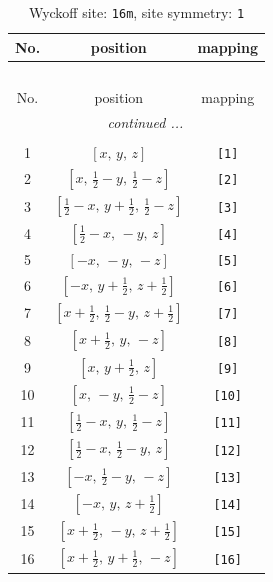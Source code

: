 \documentclass[fleqn,8pt]{jsarticle}
\begin{document}
\begin{longtable}{ccc}
\caption{Wyckoff site: {\tt 16m}, site symmetry: {\tt 1}}
 \\
 \hline \hline
No. & position & mapping \\ \hline \endfirsthead

\multicolumn{2}{l}{\tablename\ \thetable{}} \\
 \hline \hline
No. & position & mapping \\ \hline \endhead

 \hline \hline
\multicolumn{2}{r}{\footnotesize\it continued ...} \\ \endfoot

 \hline \hline
\multicolumn{2}{r}{} \\ \endlastfoot

1 & $\left[ x,\, y,\, z \right]$ & {\tt [1]} \\ \hline
2 & $\left[ x,\, \frac{1}{2} - y,\, \frac{1}{2} - z \right]$ & {\tt [2]} \\ \hline
3 & $\left[ \frac{1}{2} - x,\, y + \frac{1}{2},\, \frac{1}{2} - z \right]$ & {\tt [3]} \\ \hline
4 & $\left[ \frac{1}{2} - x,\, - y,\, z \right]$ & {\tt [4]} \\ \hline
5 & $\left[ - x,\, - y,\, - z \right]$ & {\tt [5]} \\ \hline
6 & $\left[ - x,\, y + \frac{1}{2},\, z + \frac{1}{2} \right]$ & {\tt [6]} \\ \hline
7 & $\left[ x + \frac{1}{2},\, \frac{1}{2} - y,\, z + \frac{1}{2} \right]$ & {\tt [7]} \\ \hline
8 & $\left[ x + \frac{1}{2},\, y,\, - z \right]$ & {\tt [8]} \\ \hline
9 & $\left[ x,\, y + \frac{1}{2},\, z \right]$ & {\tt [9]} \\ \hline
10 & $\left[ x,\, - y,\, \frac{1}{2} - z \right]$ & {\tt [10]} \\ \hline
11 & $\left[ \frac{1}{2} - x,\, y,\, \frac{1}{2} - z \right]$ & {\tt [11]} \\ \hline
12 & $\left[ \frac{1}{2} - x,\, \frac{1}{2} - y,\, z \right]$ & {\tt [12]} \\ \hline
13 & $\left[ - x,\, \frac{1}{2} - y,\, - z \right]$ & {\tt [13]} \\ \hline
14 & $\left[ - x,\, y,\, z + \frac{1}{2} \right]$ & {\tt [14]} \\ \hline
15 & $\left[ x + \frac{1}{2},\, - y,\, z + \frac{1}{2} \right]$ & {\tt [15]} \\ \hline
16 & $\left[ x + \frac{1}{2},\, y + \frac{1}{2},\, - z \right]$ & {\tt [16]} \\
\end{longtable}
\end{document}
